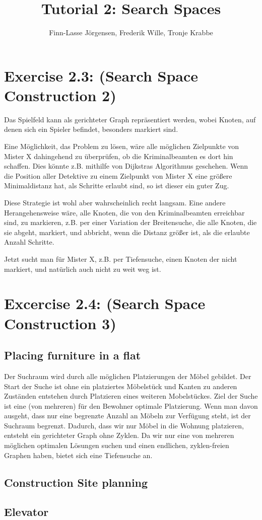 \documentclass[12pt,a4paper]{article}
\author{Finn-Lasse Jörgensen, Frederik Wille, Tronje Krabbe}
\title{Tutorial 2: Search Spaces}
\begin{document}
\maketitle


\section*{Exercise 2.3: (Search Space Construction 2)} %
Das Spielfeld kann als gerichteter Graph repräsentiert werden,
wobei Knoten, auf denen sich ein Spieler befindet, besonders
markiert sind.

Eine Möglichkeit, das Problem zu lösen, wäre alle möglichen Zielpunkte
von Mister X dahingehend zu überprüfen, ob die Kriminalbeamten
es dort hin schaffen. Dies könnte z.B. mithilfe von Dijkstras
Algorithmus geschehen. Wenn die Position aller Detektive zu einem
Zielpunkt von Mister X eine größere Minimaldistanz hat,
als Schritte erlaubt sind, so ist dieser ein guter Zug.

Diese Strategie ist wohl aber wahrscheinlich recht langsam.
Eine andere Herangehensweise wäre, alle Knoten, die von
den Kriminalbeamten erreichbar sind, zu markieren, z.B.
per einer Variation der Breitensuche, die alle Knoten, die sie abgeht,
markiert, und abbricht, wenn die Distanz größer ist, als
die erlaubte Anzahl Schritte.

Jetzt sucht man für Mister X, z.B. per Tiefensuche,
einen Knoten der nicht markiert, und natürlich auch nicht zu
weit weg ist.

\section*{Excercise 2.4: (Search Space Construction 3)}
\subsection*{Placing furniture in a flat}
Der Suchraum wird durch alle möglichen Platzierungen der Möbel gebildet. Der Start der Suche ist ohne ein platziertes Möbelstück und Kanten zu anderen Zuständen entstehen durch Platzieren eines weiteren Mobelstückes.
Ziel der Suche ist eine (von mehreren) für den Bewohner optimale Platzierung.
Wenn man davon ausgeht, dass nur eine begrenzte Anzahl an Möbeln zur Verfügung steht, ist der Suchraum begrenzt. Dadurch, dass wir nur Möbel in die Wohnung platzieren, entsteht ein gerichteter Graph ohne Zyklen.
Da wir nur eine von mehreren möglichen optimalen Lösungen suchen und einen endlichen, zyklen-freien Graphen haben, bietet sich eine Tiefensuche an.
\subsection*{Construction Site planning}

\subsection*{Elevator}
\end{document}
